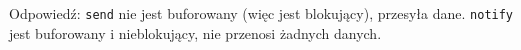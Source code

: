 Odpowiedź: \texttt{send} nie jest buforowany (więc jest blokujący), przesyła dane. \texttt{notify} jest buforowany i nieblokujący, nie przenosi żadnych danych.
